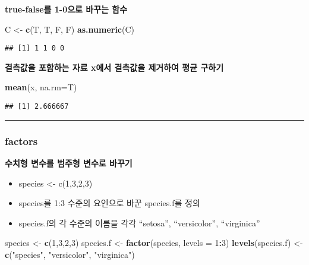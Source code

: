 \documentclass[]{article}
\newenvironment{Shaded}{\begin{snugshade}}{\end{snugshade}}
\newcommand{\KeywordTok}[1]{\textcolor[rgb]{0.13,0.29,0.53}{\textbf{#1}}}
\newcommand{\DataTypeTok}[1]{\textcolor[rgb]{0.13,0.29,0.53}{#1}}
\newcommand{\DecValTok}[1]{\textcolor[rgb]{0.00,0.00,0.81}{#1}}
\newcommand{\StringTok}[1]{\textcolor[rgb]{0.31,0.60,0.02}{#1}}
\newcommand{\OperatorTok}[1]{\textcolor[rgb]{0.81,0.36,0.00}{\textbf{#1}}}
\newcommand{\NormalTok}[1]{#1}
\providecommand{\tightlist}{%
  \setlength{\itemsep}{0pt}\setlength{\parskip}{0pt}}
\begin{document}
\textbf{true-false를 1-0으로 바꾸는 함수}

\begin{Shaded}
\begin{Highlighting}[]
\NormalTok{C <-}\StringTok{ }\KeywordTok{c}\NormalTok{(T, T, F, F)}
\KeywordTok{as.numeric}\NormalTok{(C)}
\end{Highlighting}
\end{Shaded}

\begin{verbatim}
## [1] 1 1 0 0
\end{verbatim}

\textbf{결측값을 포함하는 자료 x에서 결측값을 제거하여 평균 구하기}

\begin{Shaded}
\begin{Highlighting}[]
\KeywordTok{mean}\NormalTok{(x, }\DataTypeTok{na.rm=}\NormalTok{T)}
\end{Highlighting}
\end{Shaded}

\begin{verbatim}
## [1] 2.666667
\end{verbatim}

\begin{center}\rule{0.5\linewidth}{\linethickness}\end{center}

\subsubsection{factors}\label{factors}

\textbf{수치형 변수를 범주형 변수로 바꾸기}

\begin{itemize}
\tightlist
\item
  species \textless{}- c(1,3,2,3)
\item
  species를 1:3 수준의 요인으로 바꾼 species.f를 정의
\item
  species.f의 각 수준의 이름을 각각 ``setosa'', ``versicolor'',
  ``virginica''
\end{itemize}

\begin{Shaded}
\begin{Highlighting}[]
\NormalTok{species <-}\StringTok{ }\KeywordTok{c}\NormalTok{(}\DecValTok{1}\NormalTok{,}\DecValTok{3}\NormalTok{,}\DecValTok{2}\NormalTok{,}\DecValTok{3}\NormalTok{)}
\NormalTok{species.f <-}\StringTok{ }\KeywordTok{factor}\NormalTok{(species, }\DataTypeTok{levels =} \DecValTok{1}\OperatorTok{:}\DecValTok{3}\NormalTok{)}
\KeywordTok{levels}\NormalTok{(species.f) <-}\StringTok{ }\KeywordTok{c}\NormalTok{(}\StringTok{"species"}\NormalTok{, }\StringTok{"versicolor"}\NormalTok{, }\StringTok{"virginica"}\NormalTok{)}
\end{Highlighting}
\end{Shaded}
\end{document}
